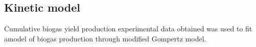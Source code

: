 \subsection{Kinetic model}
Cumulative biogas yield production experimental data obtained was used to fit amodel of biogas production through modified Gompertz model.